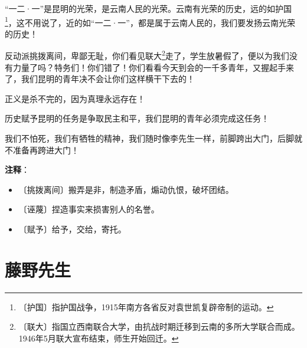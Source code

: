 \documentclass[12pt,UTF-8,openany]{ctexbook}
\begin{document}
\begin{normalsize}
    “一二·一”是昆明的光荣，是云南人民的光荣。云南有光荣的历史，远的如护国\footnote{〔护国〕指护国战争，1915年南方各省反对袁世凯复辟帝制的运动。}，这不用说了，近的如“一二·一”，都是属于云南人民的，我们要发扬云南光荣的历史！
    
    反动派挑拨离间，卑鄙无耻，你们看见联大\footnote{〔联大〕指国立西南联合大学，由抗战时期迁移到云南的多所大学联合而成。1946年5月联大宣布结束，师生开始回迁。}走了，学生放暑假了，便以为我们没有力量了吗？特务们！你们错了！你们看看今天到会的一千多青年，又握起手来了，我们昆明的青年决不会让你们这样横干下去的！
    
    正义是杀不完的，因为真理永远存在！
    
    历史赋予昆明的任务是争取民主和平，我们昆明的青年必须完成这任务！
    
    我们不怕死，我们有牺牲的精神，我们随时像李先生一样，前脚跨出大门，后脚就不准备再跨进大门！
    
\end{normalsize}


\newpage

\textbf{注释}：

\vspace{-1em}

\begin{itemize}
    \setlength\itemsep{-0.2em}
    \item 〔挑拨离间〕搬弄是非，制造矛盾，煽动仇恨，破坏团结。
    \item 〔诬蔑〕捏造事实来损害别人的名誉。
    \item 〔赋予〕给予，交给，寄托。
\end{itemize}

\chapter{藤野先生}
\end{document}
